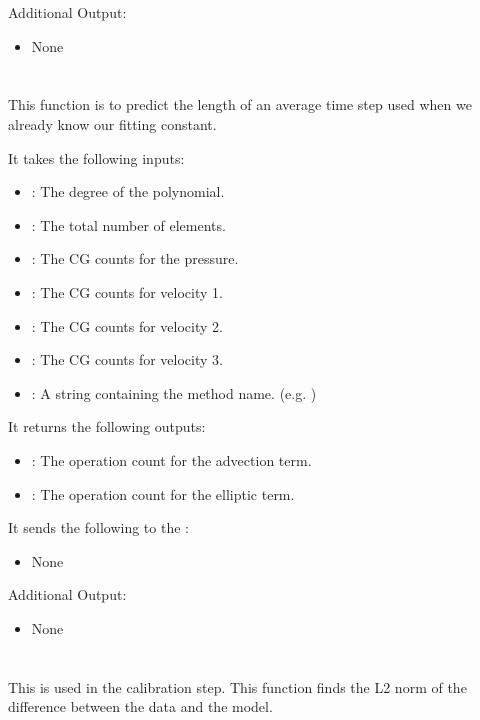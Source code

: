 Additional Output:
\begin{itemize}
\item None
\end{itemize}

\section{}
This function is to predict the length of an average time step used when we already know our fitting constant. 

It takes the following inputs:

\begin{itemize}
\item {}: The degree of the polynomial.
\item {}: The total number of elements.
\item {}: The CG counts for the pressure.
\item {}: The CG counts for velocity 1.
\item {}: The CG counts for velocity 2.
\item {}: The CG counts for velocity 3.
\item {}: A string containing the method name. (e.g. )

\end{itemize}

It returns the following outputs:

\begin{itemize}
\item {}: The operation count for the advection term.
\item {}: The operation count for the elliptic term.
\end{itemize}

It sends the following to the :

\begin{itemize}
\item None
\end{itemize}

Additional Output:
\begin{itemize}
\item None
\end{itemize}

\section{}
This is used in the calibration step. This function finds the L2 norm of the difference between the data and the model. 


